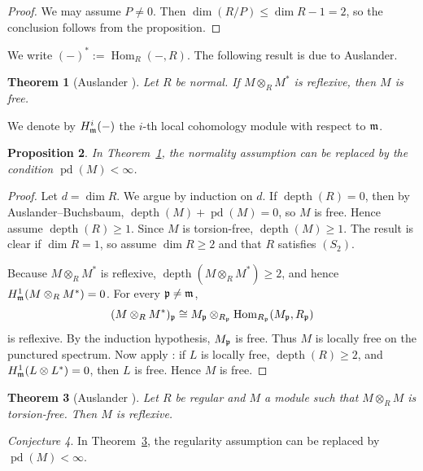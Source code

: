 \documentclass[11.05pt,a4paper]{amsart}
\newtheorem{theorem}{Theorem}[section]
\newtheorem{proposition}[theorem]{Proposition}
\theoremstyle{definition}
\theoremstyle{remark}
\newtheorem{conjecture}[theorem]{Conjecture}
\newcommand{\pd}{\operatorname{pd}}
\newcommand{\Hom}{\operatorname{Hom}}
\newcommand{\depth}{\operatorname{depth}}
\newcommand{\fm}{\frak{m}}
\newcommand{\fp}{\frak{p}}
\begin{document}
\begin{proof}
	We may assume \( P \neq 0 \). Then \( \dim(R/P) \le \dim R - 1 = 2 \), so the conclusion follows from the proposition.
\end{proof}

We write \( (-)^* := \Hom_R(-,R) \). The following result is due to Auslander.

\begin{theorem}[Auslander {\cite[Proposition 3.2]{au}}]\label{2.4}
	Let \( R \) be normal. If \( M \otimes_R M^* \) is reflexive, then \( M \) is free.
\end{theorem}

We denote by \( H^i_{\fm}(-) \) the \( i \)-th local cohomology module with respect to \( \fm \).

\begin{proposition}\label{30}
	In Theorem~\ref{2.4}, the normality assumption can be replaced by the condition \( \pd(M) < \infty \).
\end{proposition}

\begin{proof}
	Let \( d = \dim R \). We argue by induction on \( d \). If \( \depth(R) = 0 \), then by Auslander–Buchsbaum, \( \depth(M) + \pd(M) = 0 \), so \( M \) is free. Hence assume \( \depth(R) \ge 1 \). Since \( M \) is torsion-free, \( \depth(M) \ge 1 \). The result is clear if \( \dim R = 1 \), so assume \( \dim R \ge 2 \) and that \( R \) satisfies \( (S_2) \).
	
	Because \( M \otimes_R M^* \) is reflexive, \( \depth(M \otimes_R M^*) \ge 2 \), and hence \( H^1_{\fm}(M \otimes_R M^*) = 0 \). For every \( \fp \ne \fm \),
	\[
	(M \otimes_R M^*)_{\fp} \cong M_{\fp} \otimes_{R_{\fp}} \Hom_{R_{\fp}}(M_{\fp}, R_{\fp})
	\]
	is reflexive. By the induction hypothesis, \( M_{\fp} \) is free. Thus \( M \) is locally free on the punctured spectrum. Now apply \cite[Lemma 8.1]{ACS}: if \( L \) is locally free, \( \depth(R) \ge 2 \), and \( H^1_{\fm}(L \otimes L^*) = 0 \), then \( L \) is free. Hence \( M \) is free.
\end{proof}

\begin{theorem}[Auslander {\cite[Theorem 3.6(c)]{au}}]\label{tor}
	Let \( R \) be regular and \( M \) a module such that \( M \otimes_R M \) is torsion-free. Then \( M \) is reflexive.
\end{theorem}

\begin{conjecture}
	In Theorem~\ref{tor}, the regularity assumption can be replaced by \( \pd(M) < \infty \).
\end{conjecture}
\end{document}
